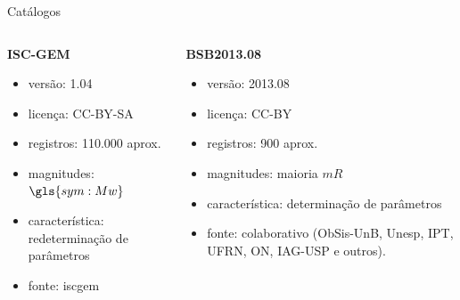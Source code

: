 \documentclass[ucs,8pt]{beamer}
\begin{document}
\begin{frame}{Catálogos}
	\begin{columns}[T]
		\begin{column}[T]{.5\textwidth}
			\textbf{ISC-GEM}\\
			\small
			\begin{itemize}
				\item versão: 1.04
				\item licença: CC-BY-SA
				\item registros: 110.000 aprox.
				\item magnitudes: $\gls{sym:Mw}$
				\item característica: redeterminação de
			parâmetros
				\item fonte: \gls{iscgem}
			\end{itemize}
		\end{column}
		
		\begin{column}[T]{.5\textwidth}
			\textbf{BSB2013.08}\\
			\small
			\begin{itemize}
				\item versão: 2013.08
				\item licença: CC-BY
				\item registros: 900 aprox.
				\item magnitudes: maioria $mR$
				\item característica: determinação de parâmetros
				\item fonte: colaborativo (ObSis-UnB, Unesp, IPT, UFRN, ON, IAG-USP e outros).
			\end{itemize}
		\end{column}
	\end{columns}
\end{frame}
\end{document}

